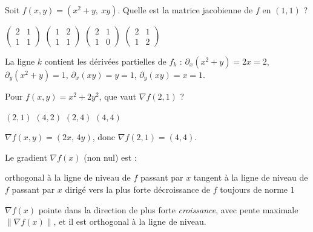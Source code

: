 
\begin{question}
Soit $f(x,y)=(x^2+y,\ xy)$. Quelle est la matrice jacobienne de $f$ en $(1,1)$ ?
\begin{reponses}
  \bonne $\begin{pmatrix}2&1\\1&1\end{pmatrix}$
  \mauvaise $\begin{pmatrix}1&2\\1&1\end{pmatrix}$
  \mauvaise $\begin{pmatrix}2&1\\1&0\end{pmatrix}$
  \mauvaise $\begin{pmatrix}2&1\\1&2\end{pmatrix}$
\end{reponses}
\begin{explication}
La ligne $k$ contient les dérivées partielles de $f_k$ : $\partial_x(x^2+y)=2x=2$, $\partial_y(x^2+y)=1$, $\partial_x(xy)=y=1$, $\partial_y(xy)=x=1$.
\end{explication}
\end{question}

\begin{question}
Pour $f(x,y)=x^2+2y^2$, que vaut $\nabla f(2,1)$ ?
\begin{reponses}
  \mauvaise $(2,1)$
  \mauvaise $(4,2)$
  \mauvaise $(2,4)$
  \bonne $(4,4)$
\end{reponses}
\begin{explication}
$\nabla f(x,y)=(2x,\,4y)$, donc $\nabla f(2,1)=(4,4)$.
\end{explication}
\end{question}

\begin{question}
Le gradient $\nabla f(x)$ (non nul) est :
\begin{reponses}
  \bonne orthogonal à la ligne de niveau de $f$ passant par $x$
  \mauvaise tangent à la ligne de niveau de $f$ passant par $x$
  \mauvaise dirigé vers la plus forte décroissance de $f$
  \mauvaise toujours de norme $1$
\end{reponses}
\begin{explication}
$\nabla f(x)$ pointe dans la direction de plus forte \emph{croissance}, avec pente maximale $\|\nabla f(x)\|$, et il est orthogonal à la ligne de niveau.
\end{explication}
\end{question}

